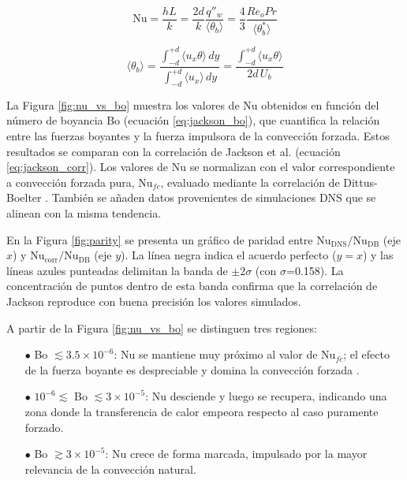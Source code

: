\begin{equation}
\text{Nu} = \frac{h L}{k} = \frac{2d}{k} \frac{q''_w}{\langle \theta_b \rangle} = \frac{4}{3} \frac{Re_o Pr}{\langle \theta^*_b \rangle}	
\label{eq:nu}
\end{equation}

\begin{equation}
\langle \theta_b \rangle = \frac{\int_{-d}^{+d} \langle u_x \theta \rangle \, dy}{\int_{-d}^{+d} \langle u_x \rangle \, dy} = \frac{\int_{-d}^{+d} \langle u_x \theta \rangle }{2d \, U_b}
\label{eq:tita_bulk}
\end{equation}

La Figura \ref{fig:nu_vs_bo} muestra los valores de Nu obtenidos en función del número de boyancia Bo (ecuación \ref{eq:jackson_bo}), que cuantifica la relación entre las fuerzas boyantes y la fuerza impulsora de la convección forzada. Estos resultados se comparan con la correlación de Jackson et al. \cite{jackson1989studies} (ecuación \ref{eq:jackson_corr}). Los valores de Nu se normalizan con el valor correspondiente a convección forzada pura, Nu$_{fc}$, evaluado mediante la correlación de Dittus-Boelter \cite{incropera}. También se añaden datos provenientes de simulaciones DNS \cite{you2003direct} que se alinean con la misma tendencia.

En la Figura \ref{fig:parity} se presenta un gráfico de paridad entre $\text{Nu}_{\text{DNS}}/\text{Nu}_{\text{DB}}$ (eje $x$) y $\text{Nu}_{\text{corr}}/\text{Nu}_{\text{DB}}$ (eje $y$). La línea negra indica el acuerdo perfecto ($y=x$) y las líneas azules punteadas delimitan la banda de $\pm2\sigma$ (con $\sigma$=0.158). La concentración de puntos dentro de esta banda confirma que la correlación de Jackson reproduce con buena precisión los valores simulados.

A partir de la Figura \ref{fig:nu_vs_bo} se distinguen tres regiones:

\begin{itemize}
  \item[$\bullet$] Bo $\lesssim 3.5 \times 10^{-6}$: Nu se mantiene muy próximo al valor de Nu$_{fc}$; el efecto de la fuerza boyante es despreciable y domina la convección forzada  \cite{li2021development}.
  \item[$\bullet$] $10^{-6} \lesssim$ Bo $\lesssim 3 \times 10^{-5}$: Nu desciende y luego se recupera, indicando una zona donde la transferencia de calor empeora respecto al caso puramente forzado.
  \item[$\bullet$] Bo $\gtrsim 3 \times 10^{-5}$: Nu crece de forma marcada, impulsado por la mayor relevancia de la convección natural.
\end{itemize}

